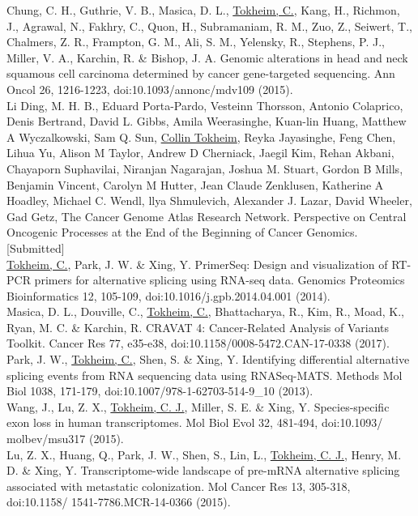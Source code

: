 \begin{vita}
Chung, C. H., Guthrie, V. B., Masica, D. L., \underline{Tokheim, C.}, Kang, H., Richmon, J., Agrawal, N., Fakhry, C., Quon, H., Subramaniam, R. M., Zuo, Z., Seiwert, T., Chalmers, Z. R., Frampton, G. M., Ali, S. M., Yelensky, R., Stephens, P. J., Miller, V. A., Karchin, R. \& Bishop, J. A. Genomic alterations in head and neck squamous cell carcinoma determined by cancer gene-targeted sequencing. Ann Oncol 26, 1216-1223, doi:10.1093/annonc/mdv109 (2015).\\

Li Ding, M. H. B., Eduard Porta-Pardo, Vesteinn Thorsson, Antonio Colaprico, Denis Bertrand, David L. Gibbs, Amila Weerasinghe, Kuan-lin Huang, Matthew A Wyczalkowski, Sam Q. Sun, \underline{Collin Tokheim}, Reyka Jayasinghe, Feng Chen, Lihua Yu, Alison M Taylor, Andrew D Cherniack, Jaegil Kim, Rehan Akbani, Chayaporn Suphavilai, Niranjan Nagarajan, Joshua M. Stuart, Gordon B Mills, Benjamin Vincent, Carolyn M Hutter, Jean Claude Zenklusen, Katherine A Hoadley, Michael C. Wendl, llya Shmulevich, Alexander J. Lazar, David Wheeler, Gad Getz, The Cancer Genome Atlas Research Network. Perspective on Central Oncogenic Processes at the End of the Beginning of Cancer Genomics. [Submitted]\\

\underline{Tokheim, C.}, Park, J. W. \& Xing, Y. PrimerSeq: Design and visualization of RT-PCR primers for alternative splicing using RNA-seq data. Genomics Proteomics Bioinformatics 12, 105-109, doi:10.1016/j.gpb.2014.04.001 (2014).\\

Masica, D. L., Douville, C., \underline{Tokheim, C.}, Bhattacharya, R., Kim, R., Moad, K., Ryan, M. C. \& Karchin, R. CRAVAT 4: Cancer-Related Analysis of Variants Toolkit. Cancer Res 77, e35-e38, doi:10.1158/0008-5472.CAN-17-0338 (2017).\\

Park, J. W., \underline{Tokheim, C.}, Shen, S. \& Xing, Y. Identifying differential alternative splicing events from RNA sequencing data using RNASeq-MATS. Methods Mol Biol 1038, 171-179, doi:10.1007/978-1-62703-514-9\_10 (2013).\\

Wang, J., Lu, Z. X., \underline{Tokheim, C. J.}, Miller, S. E. \& Xing, Y. Species-specific exon loss in human transcriptomes. Mol Biol Evol 32, 481-494, doi:10.1093/ molbev/msu317 (2015). \\

Lu, Z. X., Huang, Q., Park, J. W., Shen, S., Lin, L., \underline{Tokheim, C. J.}, Henry, M. D. \& Xing, Y. Transcriptome-wide landscape of pre-mRNA alternative splicing associated with metastatic colonization. Mol Cancer Res 13, 305-318, doi:10.1158/ 1541-7786.MCR-14-0366 (2015). \\


\end{vita}
